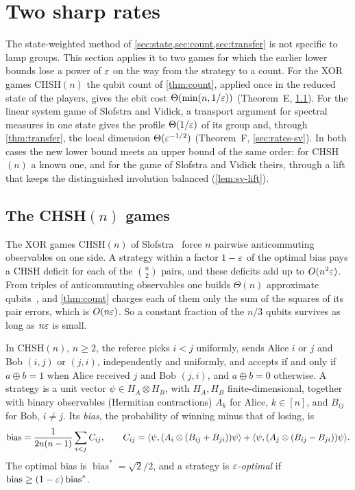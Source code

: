 \section{Two sharp rates}\label{sec:rates}

The state-weighted method of \cref{sec:state,sec:count,sec:transfer} is not specific to lamp groups. This section applies it to two games
for which the earlier lower bounds lose a power of $\varepsilon$ on the way from the strategy to a count. For the XOR games CHSH$(n)$ the qubit count of \cref{thm:count}, applied once in the reduced state
of the players, gives the ebit cost $\Theta(\min(n,1/\varepsilon))$ (Theorem~E, \cref{sec:rates-chsh}). For the linear system game of Slofstra
and Vidick, a transport argument for spectral measures in one state gives the profile $\Theta(1/\varepsilon)$ of its group and, through
\cref{thm:transfer}, the local dimension $\Theta(\varepsilon^{-1/2})$ (Theorem~F, \cref{sec:rates-sv}). In both cases the new lower bound meets an
upper bound of the same order: for CHSH$(n)$ a known one, and for the game of Slofstra and Vidick theirs, through a lift that keeps the
distinguished involution balanced (\cref{lem:sv-lift}).

\subsection{The CHSH\texorpdfstring{$(n)$}{(n)} games}\label{sec:rates-chsh}

The XOR games CHSH$(n)$ of Slofstra~\cite{Slo11} force $n$ pairwise anticommuting observables on one side. A strategy within a factor
$1-\varepsilon$ of the optimal bias pays a CHSH deficit for each of the $\binom n2$ pairs, and these deficits add up to $O(n^2\varepsilon)$. From triples
of anticommuting observables one builds $\Theta(n)$ approximate qubits~\cite{OV18}, and \cref{thm:count} charges each of them only the sum
of the squares of its pair errors, which is $O(n\varepsilon)$. So a constant fraction of the $n/3$ qubits survives as long as $n\varepsilon$ is small.

\begin{definition}\label{def:chsh}
In CHSH$(n)$, $n\ge2$, the referee picks $i<j$ uniformly, sends Alice $i$ or $j$ and Bob $(i,j)$ or $(j,i)$, independently and uniformly,
and accepts if and only if $a\oplus b=1$ when Alice received $j$ and Bob $(j,i)$, and $a\oplus b=0$ otherwise. A strategy is a unit vector
$\psi\in H_A\otimes H_B$, with $H_A,H_B$ finite-dimensional, together with binary observables (Hermitian contractions) $A_k$ for Alice,
$k\in[n]$, and $B_{ij}$ for Bob, $i\ne j$. Its \emph{bias}, the probability of winning minus that of losing, is
\[
\operatorname{bias}=\frac1{2n(n-1)}\sum_{i<j}C_{ij},\qquad C_{ij}=\langle \psi,(A_i\otimes(B_{ij}+B_{ji}))\psi\rangle+\langle \psi,(A_j\otimes(B_{ij}-B_{ji}))\psi\rangle.
\]
The optimal bias is $\operatorname{bias}^*=\sqrt2/2$, and a strategy is \emph{$\varepsilon$-optimal} if $\operatorname{bias}\ge(1-\varepsilon)\operatorname{bias}^*$.
\end{definition}

